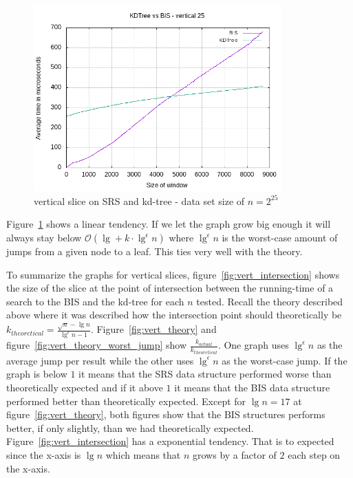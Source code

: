 \begin{figure}[h]
    \centering
    \includegraphics[width = 0.85\textwidth]{pictures/analysis/vert_25.png}
    \caption{vertical slice on SRS and kd-tree - data set size of $n=2^{25}$}\label{fig:vert_25}
\end{figure}

\clearpage
Figure~\ref{fig:vert_25} shows a linear tendency. If we let the graph grow big enough it will always stay below $\mathcal{O}(\lg + k\cdot\lg^\epsilon n)$ where $\lg^\epsilon n$ is the worst-case amount of jumps from a given node to a leaf. This ties very well with the theory.



To summarize the graphs for vertical slices, figure~\ref{fig:vert_intersection} shows the size of the slice at the point of intersection between the running-time of a search to the BIS and the kd-tree for each $n$ tested. Recall the theory described above where it was described how the intersection point should theoretically be $k_{theoretical} = \frac{\sqrt{n} - \lg n}{\lg^\epsilon n - 1}$. Figure~\ref{fig:vert_theory} and figure~\ref{fig:vert_theory_worst_jump} show $\frac{k_{actual}}{k_{theoretical}}$. One graph uses $\lg^\epsilon n$ as the average jump per result while the other uses $\lg^\epsilon n$ as the worst-case jump. If the graph is below $1$ it means that the SRS data structure performed worse than theoretically expected and if it above $1$ it means that the BIS data structure performed better than theoretically expected. Except for $\lg n = 17$ at figure~\ref{fig:vert_theory}, both figures show that the BIS structures performs better, if only slightly, than we had theoretically expected. Figure~\ref{fig:vert_intersection} has a exponential tendency. That is to expected since the x-axis is $\lg n$ which means that $n$ grows by a factor of $2$ each step on the x-axis.

